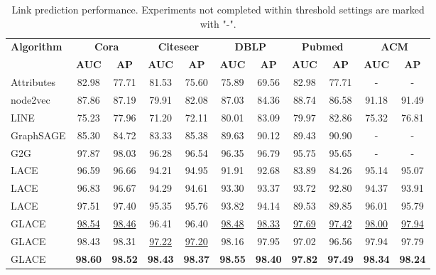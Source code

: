 \documentclass[runningheads]{llncs}
\begin{document}
\begin{table}[t]
\caption{\small Link prediction performance. Experiments not completed within threshold settings are marked with "-".}
\label{tab:link_prediction_homo}
\vspace{-2mm}
\begin{center}
    \begin{tabular}{|l|cc|cc|cc|cc|cc|}
        \hline
        \textbf{Algorithm} &
        \multicolumn{2}{c|}{\textbf{Cora}} & \multicolumn{2}{c|}{\textbf{Citeseer}} & \multicolumn{2}{c|}{\textbf{DBLP}} & \multicolumn{2}{c|}{\textbf{Pubmed}} & \multicolumn{2}{c|}{\textbf{ACM}}\\
& \textbf{AUC} & \textbf{AP} & \textbf{AUC} & \textbf{AP} & \textbf{AUC} & \textbf{AP} & \textbf{AUC} & \textbf{AP} & \textbf{AUC} & \textbf{AP}\\
        \hline
        Attributes & 
        82.98 & 77.71 & 81.53 & 75.60 & 75.89 & 69.56 & 82.98 & 77.71 & - & - \\
        node2vec & 
        87.86 & 87.19 & 79.91 & 82.08 & 87.03 & 84.36 & 88.74 & 86.58 & 91.18 & 91.49 \\
        LINE & 
        75.23 & 77.96 & 71.20 & 72.11 & 80.01 & 83.09 & 79.97 & 82.86 & 75.32 & 76.81 \\
        GraphSAGE &
        85.30 & 84.72 & 83.33 & 85.38 & 89.63 & 90.12 & 89.43 & 90.90 & - & - \\
        G2G & 
        97.87 & 98.03 & 96.28 & 96.54 & 96.35 & 96.79 & 95.75 & 95.65 & - & - \\
        \hline
        LACE & 
        96.59 & 96.66 & 94.21 & 94.95 & 91.91 & 92.68 & 83.89 & 84.26 & 95.14 & 95.07 \\
        LACE & 
        96.83 & 96.67 & 94.29 & 94.61 & 93.30 & 93.37 & 93.72 & 92.80 & 94.37 & 93.91 \\
        LACE & 
        97.51 & 97.40 & 95.35 & 95.76 & 93.82 & 94.14 & 89.53 & 89.85 & 96.01 & 95.79 \\
        GLACE & 
        \underline{98.54} & \underline{98.46} & 96.41 & 96.40 & \underline{98.48} & \underline{98.33} & \underline{97.69} & \underline{97.42} & \underline{98.00} & \underline{97.94} \\
        GLACE & 
        98.43 & 98.31 & \underline{97.22} & \underline{97.20} & 98.16 & 97.95 & 97.02 & 96.56 & 97.94 & 97.79 \\
        GLACE & 
        \textbf{98.60} & \textbf{98.52} & \textbf{98.43} & \textbf{98.37} & \textbf{98.55} & \textbf{98.40} & \textbf{97.82} & \textbf{97.49} & \textbf{98.34} & \textbf{98.24} \\
        \hline
    \end{tabular}
\end{center}
\vspace{-8mm}
\end{table}
\end{document}
